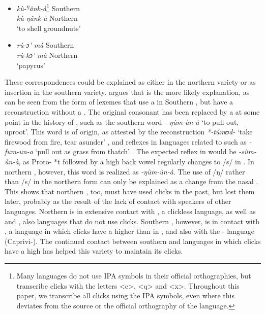 \documentclass[output=paper
,newtxmath
,modfonts
,nonflat]{langsci/langscibook}
\begin{document}
\begin{itemize}
\item  
\textit{kù-\textsuperscript{ŋ}}\textit{{\textbar}ânk-à}\footnote{Many  languages do not use IPA symbols in their official orthographies, but transcribe clicks with the letters <c>, <q> and <x>. Throughout this paper, we transcribe all clicks using the IPA symbols, even where this deviates from the source or the official orthography of the language.}  Southern \\
\textit{kù-ŋ}\textit{ânk-à}   Northern \\
‘to shell groundnuts’  
 \item  
\textit{rù-{\textbar}}\textit{ɔ\'{} mà}  Southern \\
\textit{rù-kɔ}\textit{\'{} mà}  Northern \\
‘papyrus’
 \end{itemize}

These correspondences could be explained as either  in the northern variety or as  insertion in the southern variety. \citet{gunninktoappear} argues that  is the more likely explanation, as can be seen from the form of lexemes that use a  in Southern , but have a  reconstruction without a . The original consonant has been replaced by a  at some point in the history of , such as the southern  word \textit{- ŋ{\textbar}ùm-ùn-à} ‘to pull out, uproot’. This word is of  origin, as attested by the reconstruction \textit{*-túmʊd-} ‘take firewood from fire, tear asunder’ \citep{Bastin2002}, and reflexes in  languages related to  such as  \textit{-fum-un-a} ‘pull out as grass from thatch’ \citep[117]{Torrend1931}. The expected reflex in  would be \textit{-sùm-ùn-à}, as Proto- *t followed by a high back vowel regularly changes to /s/ in  \citep[118]{Bostoen2009}. In northern , however, this word is realized as \textit{-ŋùm-ùn-à}. The use of /ŋ/ rather than /s/ in the northern  form can only be explained as a change from the nasal . This shows that northern , too, must have used clicks in the past, but lost them later, probably as the result of the lack of contact with speakers of other  languages. Northern  is in extensive contact with , a clickless  language, as well as  and , also  languages that do not use clicks. Southern , however, is in contact with , a  language in which clicks have a higher  than in , and also with the - language (Caprivi-). The continued contact between southern  and languages in which clicks have a high  has helped this variety to maintain its clicks. 
\end{document}
